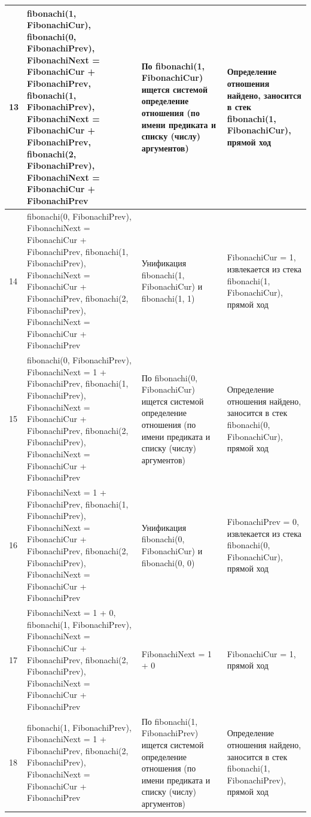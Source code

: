 \documentclass[a4paper,14pt]{extreport} %
\begin{document}
\begin{longtable}{|p{0.5cm}|p{5cm}|p{6cm}|p{5.5cm}|}
	13 & fibonachi(1, FibonachiCur), fibonachi(0, FibonachiPrev), FibonachiNext = FibonachiCur + FibonachiPrev, fibonachi(1, FibonachiPrev), FibonachiNext = FibonachiCur + FibonachiPrev, fibonachi(2, FibonachiPrev), FibonachiNext = FibonachiCur + FibonachiPrev  & По fibonachi(1, FibonachiCur) ищется системой определение отношения (по имени предиката и списку (числу) аргументов) & Определение отношения найдено, заносится в стек fibonachi(1, FibonachiCur), прямой ход \\ \hline
	
	14 & fibonachi(0, FibonachiPrev), FibonachiNext = FibonachiCur + FibonachiPrev, fibonachi(1, FibonachiPrev), FibonachiNext = FibonachiCur + FibonachiPrev, fibonachi(2, FibonachiPrev), FibonachiNext = FibonachiCur + FibonachiPrev  & Унификация fibonachi(1, FibonachiCur) и fibonachi(1, 1) & FibonachiCur = 1, извлекается из стека fibonachi(1, FibonachiCur), прямой ход \\ \hline
	
	15 & fibonachi(0, FibonachiPrev), FibonachiNext = 1 + FibonachiPrev, fibonachi(1, FibonachiPrev), FibonachiNext = FibonachiCur + FibonachiPrev, fibonachi(2, FibonachiPrev), FibonachiNext = FibonachiCur + FibonachiPrev  & По fibonachi(0, FibonachiCur) ищется системой определение отношения (по имени предиката и списку (числу) аргументов) & Определение отношения найдено, заносится в стек fibonachi(0, FibonachiCur), прямой ход \\ \hline
	
	16 & FibonachiNext = 1 + FibonachiPrev, fibonachi(1, FibonachiPrev), FibonachiNext = FibonachiCur + FibonachiPrev, fibonachi(2, FibonachiPrev), FibonachiNext = FibonachiCur + FibonachiPrev  & Унификация fibonachi(0, FibonachiCur) и fibonachi(0, 0) & FibonachiPrev = 0, извлекается из стека fibonachi(0, FibonachiCur), прямой ход \\ \hline
	
	17 & FibonachiNext = 1 + 0, fibonachi(1, FibonachiPrev), FibonachiNext = FibonachiCur + FibonachiPrev, fibonachi(2, FibonachiPrev), FibonachiNext = FibonachiCur + FibonachiPrev  & FibonachiNext = 1 + 0 & FibonachiCur = 1, прямой ход \\ \hline
	
	18 & fibonachi(1, FibonachiPrev), FibonachiNext = 1 + FibonachiPrev, fibonachi(2, FibonachiPrev), FibonachiNext = FibonachiCur + FibonachiPrev  & По fibonachi(1, FibonachiPrev) ищется системой определение отношения (по имени предиката и списку (числу) аргументов) & Определение отношения найдено, заносится в стек fibonachi(1, FibonachiPrev), прямой ход \\ \hline
	

\end{longtable}
\end{document}
